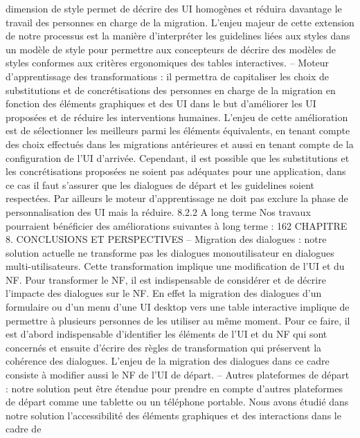 \documentclass{article}
\begin{document}
dimension de style permet de d\'{e}crire des UI homog\`{e}nes et r\'{e}duira davantage le travail des
personnes en charge de la migration. L’enjeu majeur de cette extension de notre processus est la
mani\`{e}re d’interpr\'{e}ter les guidelines li\'{e}es aux styles dans un mod\`{e}le de style pour permettre aux
concepteurs de d\'{e}crire des mod\`{e}les de styles conformes aux crit\`{e}res ergonomiques des tables
interactives.
– Moteur d’apprentissage des transformations : il permettra de capitaliser les choix de substitutions et de concr\'{e}tisations des personnes en charge de la migration en fonction des \'{e}l\'{e}ments
graphiques et des UI dans le but d’am\'{e}liorer les UI propos\'{e}es et de r\'{e}duire les interventions
humaines. L’enjeu de cette am\'{e}lioration est de s\'{e}lectionner les meilleurs parmi les \'{e}l\'{e}ments
\'{e}quivalents, en tenant compte des choix effectu\'{e}s dans les migrations ant\'{e}rieures et aussi en
tenant compte de la conﬁguration de l’UI d’arriv\'{e}e. Cependant, il est possible que les substitutions et les concr\'{e}tisations propos\'{e}es ne soient pas ad\'{e}quates pour une application, dans ce cas
il faut s’assurer que les dialogues de d\'{e}part et les guidelines soient respect\'{e}es. Par ailleurs le
moteur d’apprentissage ne doit pas exclure la phase de personnalisation des UI mais la r\'{e}duire.
8.2.2
A long terme
Nos travaux pourraient b\'{e}n\'{e}ﬁcier des am\'{e}liorations suivantes \`{a} long terme :
162
CHAPITRE 8. CONCLUSIONS ET PERSPECTIVES
– Migration des dialogues : notre solution actuelle ne transforme pas les dialogues monoutilisateur en dialogues multi-utilisateurs. Cette transformation implique une modiﬁcation de
l’UI et du NF. Pour transformer le NF, il est indispensable de consid\'{e}rer et de d\'{e}crire l’impacte
des dialogues sur le NF. En effet la migration des dialogues d’un formulaire ou d’un menu d’une
UI desktop vers une table interactive implique de permettre \`{a} plusieurs personnes de les utiliser
au m\^{e}me moment. Pour ce faire, il est d’abord indispensable d’identiﬁer les \'{e}l\'{e}ments de l’UI et
du NF qui sont concern\'{e}s et ensuite d’\'{e}crire des r\`{e}gles de transformation qui pr\'{e}servent la coh\'{e}rence des dialogues. L’enjeu de la migration des dialogues dans ce cadre consiste \`{a} modiﬁer
aussi le NF de l’UI de d\'{e}part.
– Autres plateformes de d\'{e}part : notre solution peut \^{e}tre \'{e}tendue pour prendre en compte
d’autres plateformes de d\'{e}part comme une tablette ou un t\'{e}l\'{e}phone portable. Nous avons \'{e}tudi\'{e}
dans notre solution l’accessibilit\'{e} des \'{e}l\'{e}ments graphiques et des interactions dans le cadre de
\end{document}
